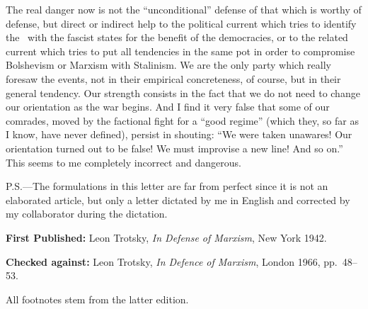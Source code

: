 The real danger now is not the “unconditional” defense of that which is worthy of defense, but direct or indirect help to the political current which tries to identify the \USSR\ with the fascist states for the benefit of the democracies, or to the related current which tries to put all tendencies in the same pot in order to compromise Bolshevism or Marxism with Stalinism. We are the only party which really foresaw the events, not in their empirical concreteness, of course, but in their general tendency. Our strength consists in the fact that we do not need to change our orientation as the war begins. And I find it very false that some of our comrades, moved by the factional fight for a “good regime” (which they, so far as I know, have never defined), persist in shouting: “We were taken unawares! Our orientation turned out to be false! We must improvise a new line! And so on.” This seems to me completely incorrect and dangerous.



\begin{postscriptum}
  P.S.---The formulations in this letter are far from perfect since it is not an elaborated article, but only a letter dictated by me in English and corrected by my collaborator during the dictation.
\end{postscriptum}


\begin{letterinfo}
  \textbf{First Published:} Leon Trotsky, \emph{In Defense of Marxism}, New York 1942.
  
  \textbf{Checked against:} Leon Trotsky, \emph{In Defence of Marxism}, London 1966, pp.~48--53.
  
  All footnotes stem from the latter edition.
\end{letterinfo}